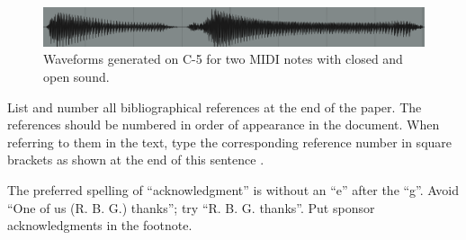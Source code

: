 \documentclass{article}
\begin{document}
\begin{sloppy}
\begin{figure}[t]
  \centering
  \centerline{\includegraphics[scale=0.32]{generated_waveform}}
  \caption{Waveforms generated on C-5 for two MIDI notes with closed and open sound.}
  \label{fig:generated_waveform}
\end{figure}

List and number all bibliographical references at the end of the paper. The references should be numbered in order of appearance in the document. When referring to them in the text, type the corresponding reference number in square brackets as shown at the end of this sentence \cite{cJones2003}. 

The preferred spelling of ``acknowledgment'' is without an “e” after the “g”. Avoid ``One of us (R. B. G.) thanks''; try ``R. B. G. thanks''. Put sponsor acknowledgments in the footnote. \cite{IEEEPDFSpec}

% 

 


\end{sloppy}
\end{document}
